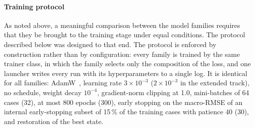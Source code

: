 \documentclass[subscriptcorrection,upint,varvw,barcolor=Goldenrod3,mathalfa=cal=euler,balance,hyphenate,french,pdf-a]{asmejour} %
\begin{document}
\paragraph{Training protocol}
As noted above, a meaningful comparison between the model families requires
that they be brought to the training stage under equal conditions. The protocol
described below was designed to that end.
The protocol is enforced by construction rather than by configuration: every
family is trained by the same trainer class, in which the family selects only the
composition of the loss, and one launcher writes every run with its
hyperparameters to a single log.
It is identical for all families: AdamW~\citep{loshchilov2019adamw}, learning rate
$3\times10^{-3}$ ($2\times10^{-3}$ in the extended track), no schedule, weight
decay $10^{-4}$, gradient-norm clipping at 1.0, mini-batches of 64 cases (32),
at most 800 epochs (300), early stopping on the macro-RMSE of an internal
early-stopping subset of 15\,\% of the training cases with patience 40 (30), and %
restoration of the best state.
\end{document}
